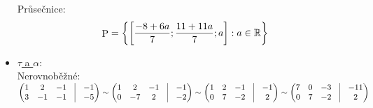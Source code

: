 \begin{itemize}
		Průsečnice:
		$$
			 \mathop{\rm {P}}\nolimits = \left\{{\left[{\frac{-8+6 a}{7}; \frac{11+11 a}{7}; a}\right]:a \in \mathbb{R}}\right\} 
		 $$
	\item \underline{$\tau$ a $\alpha$}: \\
		Nerovnoběžné:\\
		 $ \begin{pmatrix}
			 1 &2 &-1 &\vline& -1 \\ 
			 3 &-1 &-1 &\vline& -5 \\ 
		 \end{pmatrix}
		 \sim
		 \begin{pmatrix}
			 1 &2 &-1 &\vline& -1 \\ 
			 0 &-7 &2 &\vline& -2 \\ 
		 \end{pmatrix}
		 \sim
		 \begin{pmatrix}
			 1 &2 &-1 &\vline& -1 \\ 
			 0 &7 &-2 &\vline& 2 \\ 
		 \end{pmatrix}
		 \sim
		 \begin{pmatrix}
			 7 &0 &-3 &\vline& -11 \\ 
			 0 &7 &-2 &\vline& 2 \\ 
		 \end{pmatrix}
		 $



\end{itemize}
